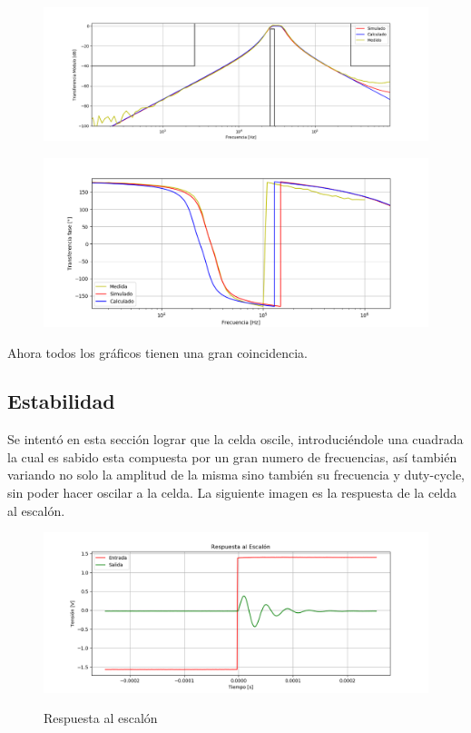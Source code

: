 \begin{figure}[H]
	\centering
	\includegraphics[width=\textwidth]{Imagenes-Ej2/BodeRauchCalcsimV2.png}
	\label{fig:Bodecalcsim}
\end{figure}
\begin{figure}[H]
	\centering
	\includegraphics[width=\textwidth]{Imagenes-Ej2/BodeRauchCalcsimFV2.png}
	\label{fig:Bodecalcsimf}
\end{figure}
Ahora todos los gráficos tienen una gran coincidencia.
\subsection{Estabilidad}
Se intentó en esta sección lograr que la celda oscile, introduciéndole una cuadrada la cual es sabido esta compuesta por un gran numero de frecuencias, así también variando no solo la amplitud de la misma sino también su frecuencia y duty-cycle, sin poder hacer oscilar a la celda. La siguiente imagen es la respuesta de la celda al escalón.
\begin{figure}[H]
	\centering
	\includegraphics[width=\textwidth]{Imagenes-Ej2/Step.png}
	\label{fig:stepresponse}
	\caption{Respuesta al escalón}
\end{figure}

